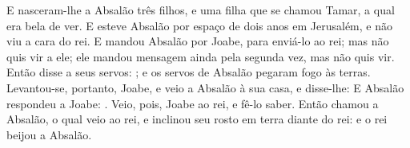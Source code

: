 {  E nasceram-lhe a Absalão três filhos, e uma filha que se chamou Tamar, a qual era bela de ver.
  E esteve Absalão por espaço de dois anos em Jerusalém, e não viu a cara do rei.
  E mandou Absalão por Joabe, para enviá-lo ao rei; mas não quis vir a ele; ele mandou mensagem ainda pela segunda vez, mas não quis vir.
  Então disse a seus servos: ; e os servos de Absalão pegaram fogo às terras.
  Levantou-se, portanto, Joabe, e veio a Absalão à sua casa, e disse-lhe: 
  E Absalão respondeu a Joabe: .
  Veio, pois, Joabe ao rei, e fê-lo saber. Então chamou a Absalão, o qual veio ao rei, e inclinou seu rosto em terra diante do rei: e o rei beijou a Absalão.
\par }

